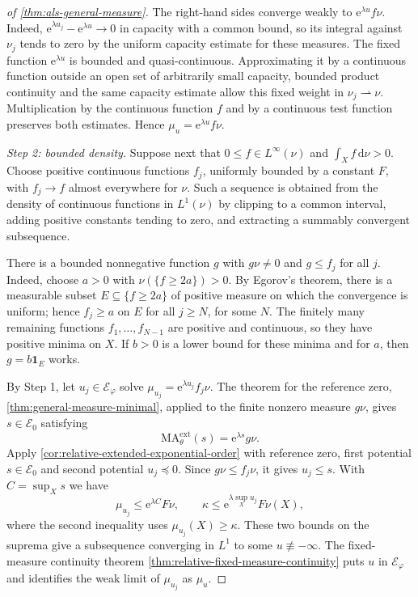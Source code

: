 \begin{proof}[of \cref{thm:als-general-measure}]
The right-hand sides converge weakly to $\mathrm{e}^{\lambda u}f\nu$. Indeed, $\mathrm{e}^{\lambda u_j}-\mathrm{e}^{\lambda u}\to0$ in capacity with a common bound, so its integral against $\nu_j$ tends to zero by the uniform capacity estimate for these measures. The fixed function $\mathrm{e}^{\lambda u}$ is bounded and quasi-continuous. Approximating it by a continuous function outside an open set of arbitrarily small capacity, bounded product continuity and the same capacity estimate allow this fixed weight in $\nu_j\rightharpoonup\nu$. Multiplication by the continuous function $f$ and by a continuous test function preserves both estimates. Hence $\mu_u=\mathrm{e}^{\lambda u}f\nu$.

\emph{Step 2: bounded density.} Suppose next that $0\leq f\in L^\infty(\nu)$ and $\int_Xf\,\mathrm{d}\nu>0$. Choose positive continuous functions $f_j$, uniformly bounded by a constant $F$, with $f_j\to f$ almost everywhere for $\nu$. Such a sequence is obtained from the density of continuous functions in $L^1(\nu)$ by clipping to a common interval, adding positive constants tending to zero, and extracting a summably convergent subsequence.

There is a bounded nonnegative function $g$ with $g\nu\ne0$ and $g\leq f_j$ for all $j$. Indeed, choose $a>0$ with $\nu(\{f\geq2a\})>0$. By Egorov's theorem, there is a measurable subset $E\subseteq\{f\geq2a\}$ of positive measure on which the convergence is uniform; hence $f_j\geq a$ on $E$ for all $j\geq N$, for some $N$. The finitely many remaining functions $f_1,\ldots,f_{N-1}$ are positive and continuous, so they have positive minima on $X$. If $b>0$ is a lower bound for these minima and for $a$, then $g=b\mathbf1_E$ works.

By Step 1, let $u_j\in\mathcal E_\varphi$ solve $\mu_{u_j}=\mathrm{e}^{\lambda u_j}f_j\nu$. The theorem for the reference zero, \cref{thm:general-measure-minimal}, applied to the finite nonzero measure $g\nu$, gives $s\in\mathcal E_0$ satisfying
\[
 \mathrm{MA}^{\mathrm{ext}}_\theta(s)=\mathrm{e}^{\lambda s}g\nu.
\]
Apply \cref{cor:relative-extended-exponential-order} with reference zero, first potential $s\in\mathcal E_0$ and second potential $u_j\preceq0$. Since $g\nu\leq f_j\nu$, it gives $u_j\leq s$. With $C=\sup_Xs$ we have
\[
 \mu_{u_j}\leq \mathrm{e}^{\lambda C}F\nu,
 \qquad
 \kappa\leq \mathrm{e}^{\lambda\sup_Xu_j}F\nu(X),
\]
where the second inequality uses $\mu_{u_j}(X)\geq\kappa$. These two bounds on the suprema give a subsequence converging in $L^1$ to some $u\not\equiv-\infty$. The fixed-measure continuity theorem \cref{thm:relative-fixed-measure-continuity} puts $u$ in $\mathcal E_\varphi$ and identifies the weak limit of $\mu_{u_j}$ as $\mu_u$.


\end{proof}
